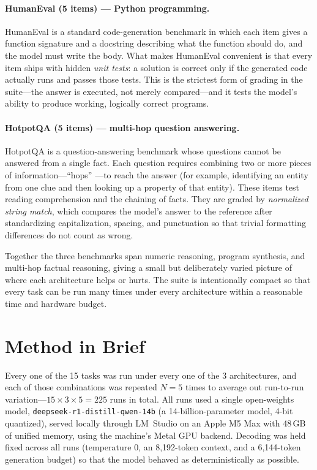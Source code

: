 \documentclass[sigconf,nonacm]{acmart}
\begin{document}
\paragraph{HumanEval (5 items) --- Python programming.} HumanEval is a standard
code-generation benchmark in which each item gives a function signature and a
docstring describing what the function should do, and the model must write the
body. What makes HumanEval convenient is that every item ships with hidden
\emph{unit tests}: a solution is correct only if the generated code actually runs
and passes those tests. This is the strictest form of grading in the suite---the
answer is executed, not merely compared---and it tests the model's ability to
produce working, logically correct programs.

\paragraph{HotpotQA (5 items) --- multi-hop question answering.} HotpotQA is a
question-answering benchmark whose questions cannot be answered from a single
fact. Each question requires combining two or more pieces of information---``hops''
---to reach the answer (for example, identifying an entity from one clue and then
looking up a property of that entity). These items test reading comprehension and
the chaining of facts. They are graded by \emph{normalized string match}, which
compares the model's answer to the reference after standardizing capitalization,
spacing, and punctuation so that trivial formatting differences do not count as
wrong.

Together the three benchmarks span numeric reasoning, program synthesis, and
multi-hop factual reasoning, giving a small but deliberately varied picture of
where each architecture helps or hurts. The suite is intentionally compact so
that every task can be run many times under every architecture within a
reasonable time and hardware budget.

\section{Method in Brief}
\label{sec:method}

Every one of the 15 tasks was run under every one of the 3 architectures, and each
of those combinations was repeated $N=5$ times to average out run-to-run
variation---$15 \times 3 \times 5 = 225$ runs in total. All runs used a single
open-weights model, \texttt{deepseek-r1-distill-qwen-14b} (a 14-billion-parameter
model, 4-bit quantized), served locally through LM~Studio on an Apple M5 Max with
48\,GB of unified memory, using the machine's Metal GPU backend. Decoding was held
fixed across all runs (temperature 0, an 8{,}192-token context, and a 6{,}144-token
generation budget) so that the model behaved as deterministically as possible.
\end{document}

